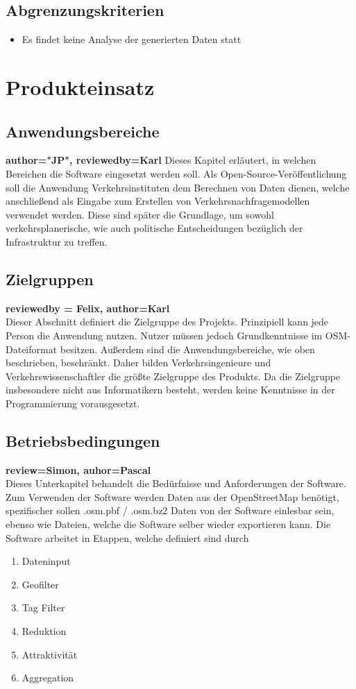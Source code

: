 \documentclass[parskip=full]{scrartcl} %
\begin{document}
\subsection{Abgrenzungskriterien}
\begin{itemize}
    \item Es findet keine Analyse der generierten Daten statt
\end{itemize}
\newpage



\section{Produkteinsatz}

\subsection{Anwendungsbereiche}
\textbf{author="JP", reviewedby=Karl} 
Dieses Kapitel erläutert, in welchen Bereichen die Software eingesetzt werden soll. Als Open-Source-Veröffentlichung soll die Anwendung Verkehrsinstituten dem Berechnen von Daten dienen, welche anschließend als Eingabe zum Erstellen von Verkehrsnachfragemodellen verwendet werden. Diese sind später die Grundlage, um sowohl verkehrsplanerische, wie auch politische Entscheidungen bezüglich der Infrastruktur zu treffen.

\subsection{Zielgruppen}
\textbf{reviewedby = Felix, author=Karl\\}
Dieser Abschnitt definiert die Zielgruppe des Projekts. Prinzipiell kann jede Person die Anwendung nutzen. Nutzer müssen jedoch Grundkenntnisse im OSM-Dateiformat besitzen. Außerdem sind die Anwendungsbereiche, wie oben beschrieben, beschränkt. Daher bilden Verkehrsingenieure und Verkehrswissenschaftler die größte Zielgruppe des Produkts. Da die Zielgruppe insbesondere nicht aus Informatikern besteht, werden keine Kenntnisse in der Programmierung vorausgesetzt.

\subsection{Betriebsbedingungen}
\textbf{review=Simon, auhor=Pascal\\}
Dieses Unterkapitel behandelt die Bedürfnisse und Anforderungen der Software.
Zum Verwenden der Software werden Daten aus der OpenStreetMap benötigt, spezifischer sollen .osm.pbf / .osm.bz2 Daten von der Software einlesbar sein, ebenso wie Dateien, welche die Software selber wieder exportieren kann.
\newpage
Die Software arbeitet in Etappen, welche definiert sind durch
\begin{enumerate}
    \item Dateninput
    \item Geofilter
    \item Tag Filter
    \item Reduktion
    \item Attraktivität
    \item Aggregation
\end{enumerate}
\end{document}
